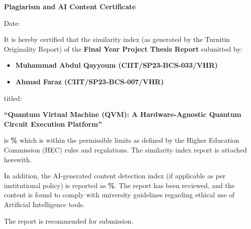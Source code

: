 
\newpage
\thispagestyle{empty}

\begin{center}
\textbf{\LARGE Plagiarism and AI Content Certificate}
\end{center}

\vspace{1cm}

\noindent
Date: \underline{\hspace{4cm}}

\vspace{1cm}

\noindent
It is hereby certified that the similarity index (as generated by the Turnitin 
Originality Report) of the \textbf{Final Year Project Thesis Report} 
submitted by:

\begin{itemize}
    \item \textbf{Muhammad Abdul Qayyoum (CIIT/SP23-BCS-033/VHR)}
    \item \textbf{Ahmad Faraz (CIIT/SP23-BCS-007/VHR)}
\end{itemize}

\noindent
titled:

\begin{center}
\textbf{``Quantum Virtual Machine (QVM): A Hardware-Agnostic Quantum Circuit Execution Platform''}
\end{center}

\noindent
is \textbf{\underline{\hspace{1.5cm}}\%} which is within the permissible limits as defined by the 
Higher Education Commission (HEC) rules and regulations. The similarity index 
report is attached herewith.

\vspace{0.5cm}

\noindent
In addition, the AI-generated content detection index (if applicable as per 
institutional policy) is reported as \textbf{\underline{\hspace{1.5cm}}\%}. The report has been reviewed, 
and the content is found to comply with university guidelines regarding 
ethical use of Artificial Intelligence tools.

\vspace{0.5cm}

\noindent
The report is recommended for submission.

\vspace{2cm}

